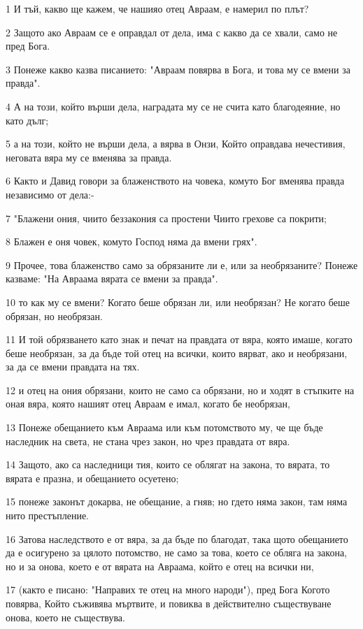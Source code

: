 \par 1 И тъй, какво ще кажем, че нашияо отец Авраам, е намерил по плът?
\par 2 Защото ако Авраам се е оправдал от дела, има с какво да се хвали, само не пред Бога.
\par 3 Понеже какво казва писанието: "Авраам повярва в Бога, и това му се вмени за правда".
\par 4 А на този, който върши дела, наградата му се не счита като благодеяние, но като дълг;
\par 5 а на този, който не върши дела, а вярва в Онзи, Който оправдава нечестивия, неговата вяра му се вменява за правда.
\par 6 Както и Давид говори за блаженството на човека, комуто Бог вменява правда независимо от дела:-
\par 7 "Блажени ония, чиито беззакония са простени Чиито грехове са покрити;
\par 8 Блажен е оня човек, комуто Господ няма да вмени грях".
\par 9 Прочее, това блаженство само за обрязаните ли е, или за необрязаните? Понеже казваме: "На Авраама вярата се вмени за правда".
\par 10 то как му се вмени? Когато беше обрязан ли, или необрязан? Не когато беше обрязан, но необрязан.
\par 11 И той обрязването като знак и печат на правдата от вяра, която имаше, когато беше необрязан, за да бъде той отец на всички, които вярват, ако и необрязани, за да се вмени правдата на тях.
\par 12 и отец на ония обрязани, които не само са обрязани, но и ходят в стъпките на оная вяра, която нашият отец Авраам е имал, когато бе необрязан,
\par 13 Понеже обещанието към Авраама или към потомството му, че ще бъде наследник на света, не стана чрез закон, но чрез правдата от вяра.
\par 14 Защото, ако са наследници тия, които се облягат на закона, то вярата, то вярата е празна, и обещанието осуетено;
\par 15 понеже законът докарва, не обещание, а гняв; но гдето няма закон, там няма нито престъпление.
\par 16 Затова наследството е от вяра, за да бъде по благодат, така щото обещанието да е осигурено за цялото потомство, не само за това, което се обляга на закона, но и за онова, което е от вярата на Авраама, който е отец на всички ни,
\par 17 (както е писано: "Направих те отец на много народи"), пред Бога Когото повярва, Който съживява мъртвите, и повиква в действително съществуване онова, което не съществува.
